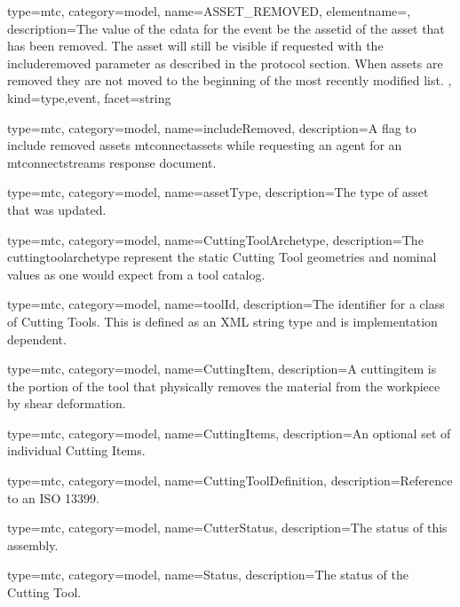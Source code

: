 {
  type=mtc,
  category=model,
  name={ASSET\_REMOVED},
  elementname=,
  description={The value of the \gls{cdata} for the event \MUST be the \gls{assetid} of the asset that has been removed. The asset will still be visible if requested with the \gls{includeremoved} parameter as described in the protocol section. When assets are removed they are not moved to the beginning of the most recently modified list. },
  kind={type,event},
  facet={\gls{string}}
}


{
  type=mtc,
  category=model,
  name={includeRemoved},
  description={A flag to include removed \gls{assets mtconnectassets} while requesting an \gls{agent} for an \gls{mtconnectstreams} \gls{response document}.}
}


{
  type=mtc,
  category=model,
  name={assetType},
  description={The type of asset that was updated.}
}


{
  type=mtc,
  category=model,
  name={CuttingToolArchetype},
  description={The \gls{cuttingtoolarchetype} represent the static Cutting Tool geometries and nominal values as one would expect from a tool catalog.}
}



{
  type=mtc,
  category=model,
  name={toolId},
  description={The identifier for a class of Cutting Tools. This is defined as an XML string type and is implementation dependent. }
}



{
  type=mtc,
  category=model,
  name={CuttingItem},
  description={A \gls{cuttingitem} is the portion of the tool that physically removes the material from the workpiece by shear deformation.}
}

{
  type=mtc,
  category=model,
  name={CuttingItems},
  description={An optional set of individual Cutting Items.}
}

{
  type=mtc,
  category=model,
  name={CuttingToolDefinition},
  description={Reference to an ISO 13399.}
}


{
  type=mtc,
  category=model,
  name={CutterStatus},
  description={The status of this assembly.}
}


{
  type=mtc,
  category=model,
  name={Status},
  description={The status of the Cutting Tool.}
}


